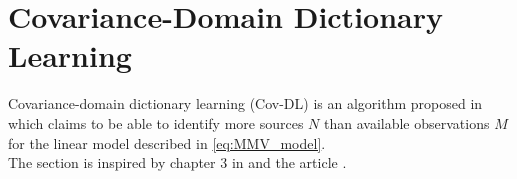 \section{Covariance-Domain Dictionary Learning}\label{sec:Cov-DL}
Covariance-domain dictionary learning (Cov-DL) is an algorithm proposed in \cite{Balkan2015} which claims to be able to identify more sources $N$ than available observations $M$ for the linear model described in \eqref{eq:MMV_model}.
\\
The section is inspired by chapter 3 in \cite{phd2015} and the article \cite{Balkan2015}.
\\ \\
